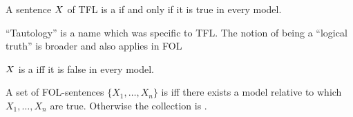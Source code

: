 \begin{definition}
	A sentence $X$ of TFL is a  if and only if it is true in every model.
\end{definition}


``Tautology'' is a name which was specific to TFL. The notion of being a ``logical truth'' is broader and also applies in FOL

\begin{definition}
	$X$ is a  iff it is false in every model.
\end{definition}


\begin{definition}
	A set of FOL-sentences $\{X_1,\ldots,X_n\}$ is  iff there exists a model relative to which $X_1,\ldots,X_n$ are true. Otherwise the collection is .
\end{definition}

